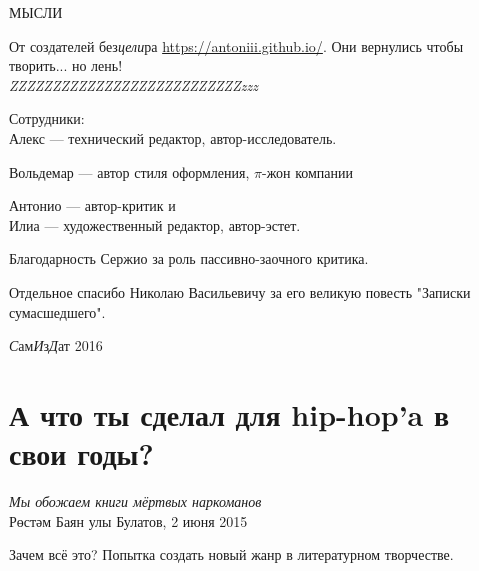 \documentclass[12pt,a4paper]{article}
\author{pine alive}
\begin{document}
\begin{titlepage}

\vspace*{\fill}
\begin{center}
\Huge МЫСЛИ
\end{center}
\vspace*{\fill}
\end{titlepage}

\begin{titlepage}
    От создателей без\emph{цели}ра \href{100 идей для стартапа}{https://antoniii.github.io/}. 
    Они вернулись чтобы творить... но лень!\\

    \emph{\Huge{ZZZ}\LARGE{ZZZ}\Large{ZZZ}\large{ZZZ}ZZZ\small{ZZZ}\footnotesize{ZZZ}\scriptsize{ZZZ}\tiny{ZZZ}\tiny{zzz}}
\end{titlepage}

\begin{center}
\end{center}
\newpage

\begin{center}
Сотрудники:\\
Алекс --- технический редактор, автор-исследователь.\\\vspace{1em}

Вольдемар --- автор стиля оформления, \( \pi\text{-жон} \) компании\\\vspace{1em}

Антонио --- автор-критик и \\Илиа --- художественный редактор, автор-эстет.\\
\end{center}


Благодарность Сержио за роль пассивно-заочного критика. 


Отдельное спасибо Николаю Васильевичу за его великую повесть "Записки сумасшедшего".
\vfill
\begin{center}
\textit{С}ам\textit{И}з\textit{Д}ат 2016
\end{center}
\newpage
\section*{А что ты сделал для hip-hop'a в свои годы?}\label{section:one}
\begin{displayquote}
\begin{flushright}
    \textit{Мы обожаем книги мёртвых наркоманов}\\
    Рөстәм Баян улы Булатов, 2 июня 2015
\end{flushright}
\end{displayquote}
Зачем всё это? Попытка создать новый жанр в литературном творчестве.
\end{document}
